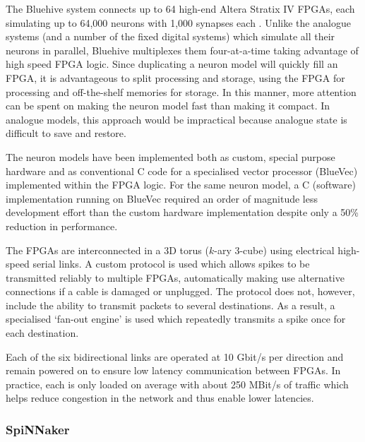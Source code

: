 				The Bluehive system connects up to 64 high-end Altera Stratix IV FPGAs,
				each simulating up to 64,000 neurons with 1,000 synapses each
				\cite{moore12}. Unlike the analogue systems (and a number of the fixed
				digital systems) which simulate all their neurons in parallel, Bluehive
				multiplexes them four-at-a-time taking advantage of high speed FPGA
				logic. Since duplicating a neuron model will quickly fill an FPGA, it is
				advantageous to split processing and storage, using the FPGA for
				processing and off-the-shelf memories for storage. In this manner, more
				attention can be spent on making the neuron model fast than making it
				compact. In analogue models, this approach would be impractical because
				analogue state is difficult to save and restore.
				
				The neuron models have been implemented both as custom, special purpose
				hardware and as conventional C code for a specialised vector processor
				(BlueVec) implemented within the FPGA logic. For the same neuron model,
				a C (software) implementation running on BlueVec required an order of
				magnitude less development effort than the custom hardware
				implementation despite only a 50\% reduction in performance.
				
				The FPGAs are interconnected in a 3D torus ($k$-ary 3-cube) using
				electrical high-speed serial links. A custom protocol is used which
				allows spikes to be transmitted reliably to multiple FPGAs,
				automatically making use alternative connections if a cable is damaged
				or unplugged. The protocol does not, however, include the ability to
				transmit packets to several destinations. As a result, a specialised
				`fan-out engine' is used which repeatedly transmits a spike once for
				each destination.
				
				Each of the six bidirectional links are operated at 10 Gbit/s per
				direction and remain powered on to ensure low latency
				communication between FPGAs. In practice, each is only loaded on average
				with about 250 MBit/s of traffic which helps reduce congestion in the
				network and thus enable lower latencies.
				
			
			\subsubsection{SpiNNaker}
				
				
